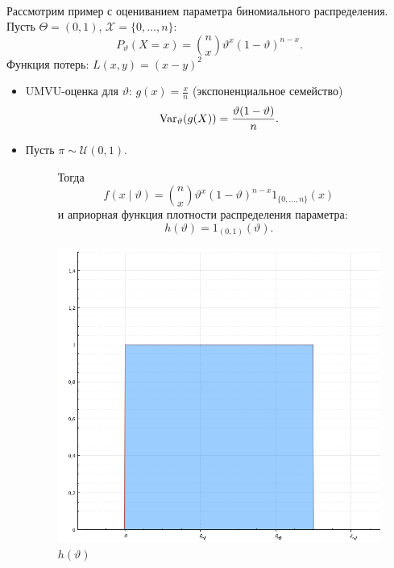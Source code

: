 \begin{exmp} \
	
	Рассмотрим пример с оцениванием параметра биномиального распределения. Пусть $\Theta = (0, 1)$, $\mathcal{X}=\{0, \dots , n\}$:
	\[P_\vartheta(X=x)=\binom{n}{x}\vartheta^x (1-\vartheta)^{n-x}.\]
	Функция потерь: $L(x,y)=(x-y)^2$
	\begin{itemize}
		\item UMVU-оценка для $\vartheta$: $g(x)=\frac{x}{n}$ (экспоненциальное семейство)
		\[\mathrm{Var}_{\vartheta}(g(X))=\frac{\vartheta(1-\vartheta)}{n}.\]
		\item Пусть $\pi \sim \mathcal{U}(0,1)$.
		
				\begin{figure}[!htb]\centering
					\begin{minipage}{0.7\textwidth} Тогда
						\[f(x \mid \vartheta) = \binom{n}{x}\vartheta^x (1-\vartheta)^{n-x} 1_{\{0, \dots , n\}}(x)\]
						и априорная функция плотности распределения параметра:
						\[h(\vartheta)=1_{(0,1)}(\vartheta).\]
					\end{minipage}
					\begin{minipage}{0.18\textwidth}
						\includegraphics[width=\linewidth, right]{uniform}
						\captionsetup{labelformat=empty}
						\caption{$h(\vartheta)$}
					\end{minipage}
				\end{figure}
			

\end{itemize}
\end{exmp}
